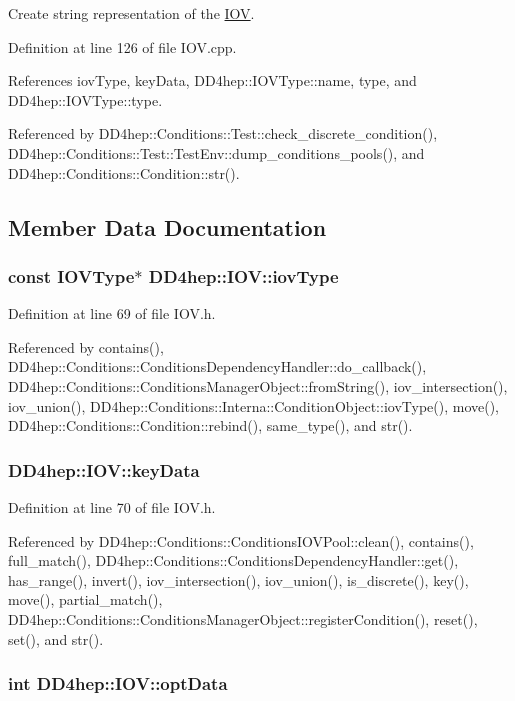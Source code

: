 Create string representation of the \hyperlink{class_d_d4hep_1_1_i_o_v}{IOV}. 

Definition at line 126 of file IOV.cpp.

References iovType, keyData, DD4hep::IOVType::name, type, and DD4hep::IOVType::type.

Referenced by DD4hep::Conditions::Test::check\_\-discrete\_\-condition(), DD4hep::Conditions::Test::TestEnv::dump\_\-conditions\_\-pools(), and DD4hep::Conditions::Condition::str().

\subsection{Member Data Documentation}
\hypertarget{class_d_d4hep_1_1_i_o_v_a885a5ed2be528cf1db783cade2a0b838}{
\subsubsection[{iovType}]{\setlength{\rightskip}{0pt plus 5cm}const {\bf IOVType}$\ast$ {\bf DD4hep::IOV::iovType}}}
\label{class_d_d4hep_1_1_i_o_v_a885a5ed2be528cf1db783cade2a0b838}


Definition at line 69 of file IOV.h.

Referenced by contains(), DD4hep::Conditions::ConditionsDependencyHandler::do\_\-callback(), DD4hep::Conditions::ConditionsManagerObject::fromString(), iov\_\-intersection(), iov\_\-union(), DD4hep::Conditions::Interna::ConditionObject::iovType(), move(), DD4hep::Conditions::Condition::rebind(), same\_\-type(), and str().\hypertarget{class_d_d4hep_1_1_i_o_v_a28eb02fd8d9c45b770e6a234303991de}{
\subsubsection[{keyData}]{ {\bf DD4hep::IOV::keyData}}}
\label{class_d_d4hep_1_1_i_o_v_a28eb02fd8d9c45b770e6a234303991de}


Definition at line 70 of file IOV.h.

Referenced by DD4hep::Conditions::ConditionsIOVPool::clean(), contains(), full\_\-match(), DD4hep::Conditions::ConditionsDependencyHandler::get(), has\_\-range(), invert(), iov\_\-intersection(), iov\_\-union(), is\_\-discrete(), key(), move(), partial\_\-match(), DD4hep::Conditions::ConditionsManagerObject::registerCondition(), reset(), set(), and str().\hypertarget{class_d_d4hep_1_1_i_o_v_a0bd227cbdf7eab4949e12bffc7238d72}{
\subsubsection[{optData}]{\setlength{\rightskip}{0pt plus 5cm}int {\bf DD4hep::IOV::optData}}}
\label{class_d_d4hep_1_1_i_o_v_a0bd227cbdf7eab4949e12bffc7238d72}


